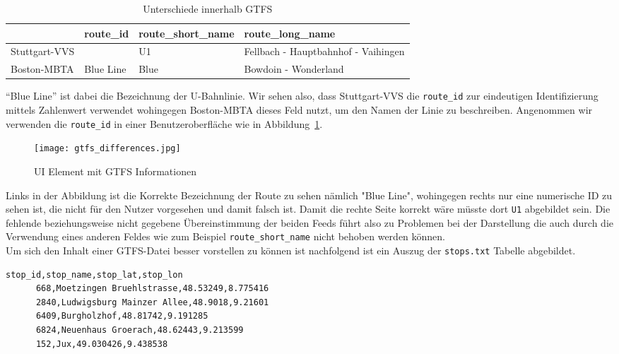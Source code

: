\begin{newpage}
    \begin{longtable}{|>{\raggedright \arraybackslash}p{3.0cm}|>{\raggedright \arraybackslash}p{2.0cm}|>{\raggedright \arraybackslash}p{3.5cm}|>{\raggedright \arraybackslash}p{5.5cm}|}
    \caption{Unterschiede innerhalb GTFS} 
    \label{table:gtfs_differences}\\
      \hline
       & route\_id & route\_short\_name & route\_long\_name\\
      \hline
      Stuttgart-VVS & 379 & U1 & Fellbach - Hauptbahnhof - Vaihingen\\
      \hline
      Boston-MBTA & Blue Line & Blue & Bowdoin - Wonderland\\
      \hline
    \end{longtable}

    "`Blue Line"' ist dabei die Bezeichnung der U-Bahnlinie\parencite{wiki_blue_line}. Wir sehen also, dass Stuttgart-VVS die \texttt{route\_id} zur eindeutigen Identifizierung mittels Zahlenwert verwendet wohingegen Boston-MBTA dieses Feld nutzt, um den Namen der Linie zu beschreiben. Angenommen wir verwenden die \texttt{route\_id} in einer Benutzeroberfläche wie in Abbildung~\ref{fig:gtfs_differences}.

    \begin{figure}[htbp]
      \begin{center}
        \texttt{[image: gtfs\_differences.jpg]}
        \caption{UI Element mit GTFS Informationen}
        \label{fig:gtfs_differences}
      \end{center}
    \end{figure}

    Links in der Abbildung ist die Korrekte Bezeichnung der Route zu sehen nämlich "Blue Line", wohingegen rechts nur eine numerische ID zu sehen ist, die nicht für den Nutzer vorgesehen und damit falsch ist. Damit die rechte Seite korrekt wäre müsste dort \texttt{U1} abgebildet sein. Die fehlende beziehungsweise nicht gegebene Übereinstimmung der beiden Feeds führt also zu Problemen bei der Darstellung die auch durch die Verwendung eines anderen Feldes wie zum Beispiel \texttt{route\_short\_name} nicht behoben werden können.\\

    Um sich den Inhalt einer GTFS-Datei besser vorstellen zu können ist nachfolgend ist ein Auszug der \texttt{stops.txt} Tabelle abgebildet.

    \begin{lstlisting}[captionpos=b, caption=Auszug der ersten Zeilen von \texttt{stops.txt}, label=lst:gtfs-auszug]
      stop_id,stop_name,stop_lat,stop_lon
      668,Moetzingen Bruehlstrasse,48.53249,8.775416
      2840,Ludwigsburg Mainzer Allee,48.9018,9.21601
      6409,Burgholzhof,48.81742,9.191285
      6824,Neuenhaus Groerach,48.62443,9.213599
      152,Jux,49.030426,9.438538
    \end{lstlisting}


\end{newpage}

